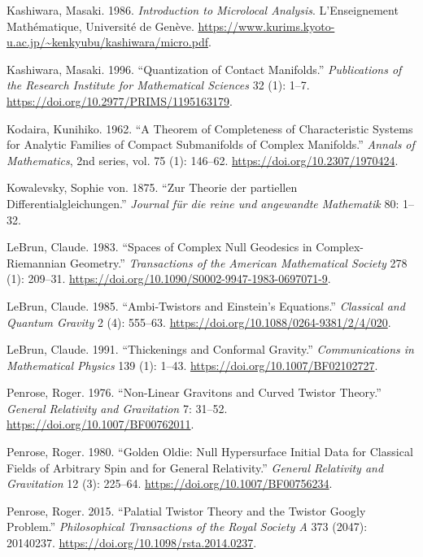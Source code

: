 \documentclass[
  english,
  11pt,
  reqno]{amsart}
\newlength{\cslhangindent}
\newenvironment{CSLReferences}[2] %
 {\begin{list}{}{%
  \setlength{\itemindent}{0pt}
  \setlength{\leftmargin}{0pt}
  \setlength{\parsep}{0pt}
  \ifodd #1
   \setlength{\leftmargin}{\cslhangindent}
   \setlength{\itemindent}{-1\cslhangindent}
  \fi
  \setlength{\itemsep}{#2\baselineskip}}}
 {\end{list}}
\begin{document}
\begin{CSLReferences}{1}{1}
Kashiwara, Masaki. 1986. \emph{Introduction to Microlocal Analysis}.
L'Enseignement Mathématique, Université de Genève.
\url{https://www.kurims.kyoto-u.ac.jp/~kenkyubu/kashiwara/micro.pdf}.

Kashiwara, Masaki. 1996. {``Quantization of Contact Manifolds.''}
\emph{Publications of the Research Institute for Mathematical Sciences}
32 (1): 1--7. \url{https://doi.org/10.2977/PRIMS/1195163179}.

Kodaira, Kunihiko. 1962. {``A Theorem of Completeness of Characteristic
Systems for Analytic Families of Compact Submanifolds of Complex
Manifolds.''} \emph{Annals of Mathematics}, 2nd series, vol. 75 (1):
146--62. \url{https://doi.org/10.2307/1970424}.

Kowalevsky, Sophie von. 1875. {``{Zur Theorie der partiellen
Differentialgleichungen}.''} \emph{{Journal für die reine und angewandte
Mathematik}} 80: 1--32.

LeBrun, Claude. 1983. {``Spaces of Complex Null Geodesics in
Complex-{Riemannian} Geometry.''} \emph{Transactions of the American
Mathematical Society} 278 (1): 209--31.
\url{https://doi.org/10.1090/S0002-9947-1983-0697071-9}.

LeBrun, Claude. 1985. {``Ambi-Twistors and {Einstein}'s Equations.''}
\emph{Classical and Quantum Gravity} 2 (4): 555--63.
\url{https://doi.org/10.1088/0264-9381/2/4/020}.

LeBrun, Claude. 1991. {``Thickenings and Conformal Gravity.''}
\emph{Communications in Mathematical Physics} 139 (1): 1--43.
\url{https://doi.org/10.1007/BF02102727}.

Penrose, Roger. 1976. {``Non-Linear Gravitons and Curved Twistor
Theory.''} \emph{General Relativity and Gravitation} 7: 31--52.
\url{https://doi.org/10.1007/BF00762011}.

Penrose, Roger. 1980. {``Golden Oldie: Null Hypersurface Initial Data
for Classical Fields of Arbitrary Spin and for General Relativity.''}
\emph{General Relativity and Gravitation} 12 (3): 225--64.
\url{https://doi.org/10.1007/BF00756234}.

Penrose, Roger. 2015. {``Palatial Twistor Theory and the Twistor Googly
Problem.''} \emph{Philosophical Transactions of the Royal Society A} 373
(2047): 20140237. \url{https://doi.org/10.1098/rsta.2014.0237}.


\end{CSLReferences}
\end{document}

